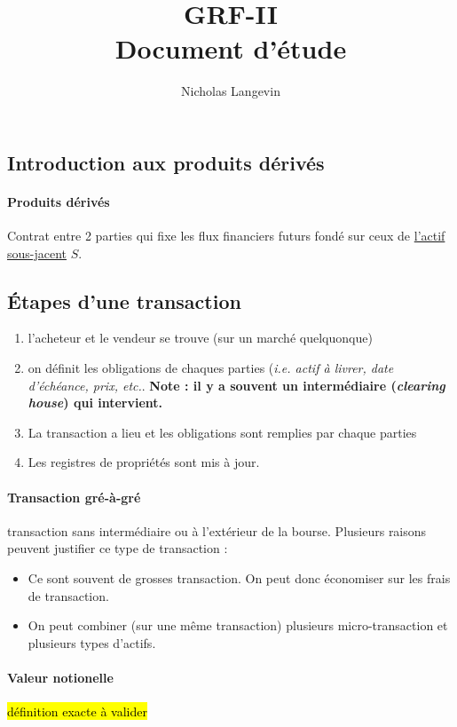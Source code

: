 \documentclass[10pt, french]{article}
\title{GRF-II \\ Document d'étude}
\author{Nicholas Langevin}
\begin{document}

\newpage

\small
\begin{multicols*}{2} %

\section{Introduction aux produits dérivés}
\paragraph{Produits dérivés} Contrat entre 2 parties qui fixe les flux financiers futurs fondé sur ceux de \underline{l'actif sous-jacent} $S$.

\subsection*{Étapes d'une transaction}
\begin{enumerate}
\item l'acheteur et le vendeur se trouve (sur un marché quelquonque)
\item on définit les obligations de chaques parties (\textit{i.e. actif à livrer, date d'échéance, prix, etc.}. \textbf{Note : il y a souvent un intermédiaire (\textit{clearing house}) qui intervient.}
\item La transaction a lieu et les obligations sont remplies par chaque parties
\item Les registres de propriétés sont mis à jour.
\end{enumerate}

\paragraph{Transaction gré-à-gré} transaction sans intermédiaire ou à l'extérieur de la bourse. Plusieurs raisons peuvent justifier ce type de transaction  :
\begin{itemize}
\item Ce sont souvent de grosses transaction. On peut donc économiser sur les frais de transaction.
\item On peut combiner (sur une même transaction) plusieurs micro-transaction et plusieurs types d'actifs.
\end{itemize}

\paragraph{Valeur notionelle} \hl{définition exacte à valider}


\end{multicols*}
\end{document}
